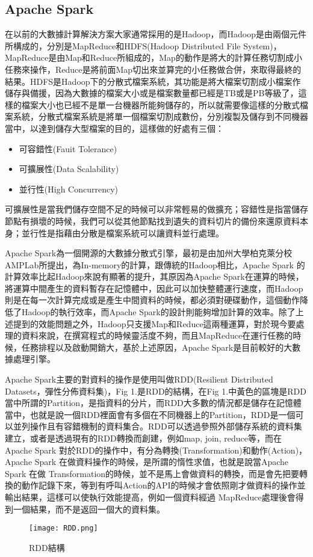 \subsection{Apache Spark}
在以前的大數據計算解決方案大家通常採用的是Hadoop\cite{hadoop}，而Hadoop是由兩個元件所構成的，分別是MapReduce和HDFS(Hadoop Distributed File System)，MapReduce是由Map和Reduce所組成的，Map的動作是將大的計算任務切割成小任務來操作，Reduce是將前面Map切出來並算完的小任務做合併，來取得最終的結果。HDFS是Hadoop下的分散式檔案系統，其功能是將大檔案切割成小檔案作儲存與備援，因為大數據的檔案大小或是檔案數量都已經是TB或是PB等級了，這樣的檔案大小也已經不是單一台機器所能夠儲存的，所以就需要像這樣的分散式檔案系統，分散式檔案系統是將單一個檔案切割成數份，分別複製及儲存到不同機器當中，以達到儲存大型檔案的目的，這樣做的好處有三個：
\begin{itemize}
\item 可容錯性(Fauit Tolerance)
\item 可擴展性(Data Scalability)
\item 並行性(High Concurrency)
\end{itemize}
可擴展性是當我們儲存空間不足的時候可以非常輕易的做擴充；容錯性是指當儲存節點有損壞的時候，我們可以從其他節點找到遺失的資料切片的備份來還原資料本身；並行性是指藉由分散是檔案系統可以讓資料並行處理。\\\par
Apache Spark\cite{spark}為一個開源的大數據分散式引擎，最初是由加州大學柏克萊分校AMPLab所提出，為In-memory的計算，跟傳統的Hadoop相比，Apache Spark 的計算效率比起Hadoop來說有顯著的提升，其原因為Apache Spark在運算的時候，將運算中間產生的資料暫存在記憶體中，因此可以加快整體運行速度，而Hadoop則是在每一次計算完成或是產生中間資料的時候，都必須對硬碟動作，這個動作降低了Hadoop的執行效率，而Apache Spark的設計則能夠增加計算的效率。除了上述提到的效能問題之外，Hadoop只支援Map和Reduce這兩種運算，對於現今要處理的資料來說，在撰寫程式的時候靈活度不夠，而且MapReduce在運行任務的時候，任務排程以及啟動開銷大，基於上述原因，Apache Spark是目前較好的大數據處理引擎。\\\par
Apache Spark主要的對資料的操作是使用叫做RDD(Resilient Distributed Datasets，彈性分佈資料集)\cite{rdd}，Fig 1.是RDD的結構，在Fig 1.中黃色的區塊是RDD當中所謂的Partition，是指資料的分片，而RDD大多數的情況都是儲存在記憶體當中，也就是說一個RDD裡面會有多個在不同機器上的Partition，RDD是一個可以並列操作且有容錯機制的資料集合。RDD可以透過參照外部儲存系統的資料集建立，或者是透過現有的RDD轉換而創建，例如map, join, reduce等，而在Apache Spark 對於RDD的操作中，有分為轉換(Transformation)和動作(Action)，Apache Spark 在做資料操作的時候，是所謂的惰性求值，也就是說當Apache Spark 在做 Transformation的時候，並不是馬上會做資料的轉換，而是會先把要轉換的動作記錄下來，等到有呼叫Action的API的時候才會依照剛才做資料的操作並輸出結果，這樣可以使執行效能提高，例如一個資料經過 MapReduce處理後會得到一個結果，而不是返回一個大的資料集。
\begin{figure}[h]
\centering
\graphicspath{{/Users/FUDA/Documents/latex/masterThesis/image/}}
\texttt{[image: RDD.png]}
\caption{RDD結構}
\end{figure}

